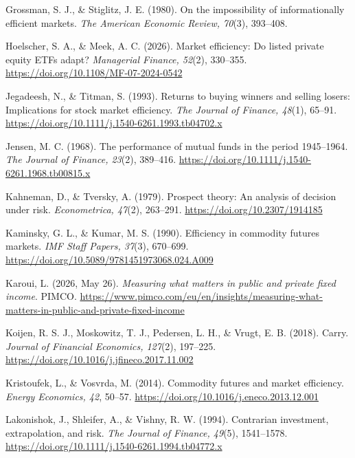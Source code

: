 \documentclass[11pt,a4paper]{article}
\begin{document}
\begin{fshfreferences}
\item Grossman, S. J., \& Stiglitz, J. E. (1980). On the impossibility of informationally efficient markets. \textit{The American Economic Review, 70}(3), 393--408.

\item Hoelscher, S. A., \& Meek, A. C. (2026). Market efficiency: Do listed private equity ETFs adapt? \textit{Managerial Finance, 52}(2), 330--355. \url{https://doi.org/10.1108/MF-07-2024-0542}

\item Jegadeesh, N., \& Titman, S. (1993). Returns to buying winners and selling losers: Implications for stock market efficiency. \textit{The Journal of Finance, 48}(1), 65--91. \url{https://doi.org/10.1111/j.1540-6261.1993.tb04702.x}

\item Jensen, M. C. (1968). The performance of mutual funds in the period 1945--1964. \textit{The Journal of Finance, 23}(2), 389--416. \url{https://doi.org/10.1111/j.1540-6261.1968.tb00815.x}

\item Kahneman, D., \& Tversky, A. (1979). Prospect theory: An analysis of decision under risk. \textit{Econometrica, 47}(2), 263--291. \url{https://doi.org/10.2307/1914185}

\item Kaminsky, G. L., \& Kumar, M. S. (1990). Efficiency in commodity futures markets. \textit{IMF Staff Papers, 37}(3), 670--699. \url{https://doi.org/10.5089/9781451973068.024.A009}

\item Karoui, L. (2026, May 26). \textit{Measuring what matters in public and private fixed income}. PIMCO. \url{https://www.pimco.com/eu/en/insights/measuring-what-matters-in-public-and-private-fixed-income}

\item Koijen, R. S. J., Moskowitz, T. J., Pedersen, L. H., \& Vrugt, E. B. (2018). Carry. \textit{Journal of Financial Economics, 127}(2), 197--225. \url{https://doi.org/10.1016/j.jfineco.2017.11.002}

\item Kristoufek, L., \& Vosvrda, M. (2014). Commodity futures and market efficiency. \textit{Energy Economics, 42}, 50--57. \url{https://doi.org/10.1016/j.eneco.2013.12.001}

\item Lakonishok, J., Shleifer, A., \& Vishny, R. W. (1994). Contrarian investment, extrapolation, and risk. \textit{The Journal of Finance, 49}(5), 1541--1578. \url{https://doi.org/10.1111/j.1540-6261.1994.tb04772.x}


\end{fshfreferences}
\end{document}
